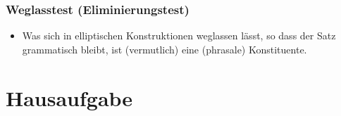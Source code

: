 \begin{frame}
\frametitle{Weglasstest (Eliminierungstest)}

\begin{itemize}
	\item Was sich in elliptischen Konstruktionen weglassen lässt, so dass der Satz grammatisch bleibt, ist (vermutlich) eine (phrasale) Konstituente.

	\eal 
	\zl

\end{itemize}

\end{frame}


\section{Hausaufgabe}

